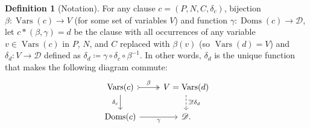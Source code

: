 \documentclass{article}
\theoremstyle{definition}
\newtheorem{definition}{Definition}
\DeclareMathOperator{\Doms}{Doms}
\DeclareMathOperator{\Vars}{Vars}
\begin{document}
\begin{definition}[Notation]
  For any clause $c = (P, N, C, \delta_c)$, bijection $\beta\colon \Vars(c) \to V$ (for some set of variables $V$) and function $\gamma\colon \Doms(c) \to \mathscr{D}$, let $c \ast (\beta, \gamma) = d$ be the clause with all occurrences of any variable $v \in \Vars(c)$ in $P$, $N$, and $C$ replaced with $\beta(v)$ (so $\Vars(d) = V$) and $\delta_d\colon V \to \mathscr{D}$ defined as $\delta_d \coloneqq \gamma \circ \delta_c \circ \beta^{-1}$. In other words, $\delta_d$ is the unique function that makes the following diagram commute:
  \[
  \begin{tikzcd}
    \Vars(c) \ar[r, tail, two heads, "\beta"] \arrow[d, swap, "\delta_c"] & V = \Vars(d) \ar[d, dashed, "\exists!\delta_d"] \\
    \Doms(c) \ar[r, swap, "\gamma"] & \mathscr{D}.
  \end{tikzcd}
  \]
\end{definition}
\end{document}

